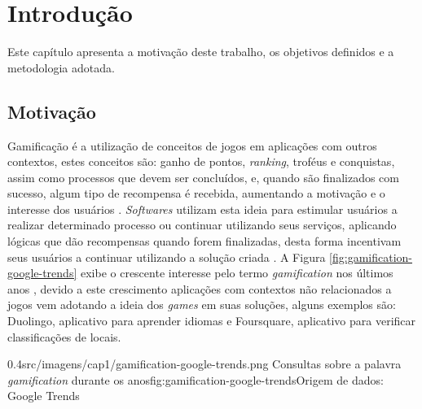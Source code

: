 \chapter[Introdução]{Introdução}
\label{ch:introducao}
\par Este capítulo apresenta a motivação deste trabalho, os objetivos definidos e a metodologia adotada.

\section{Motivação}

\par Gamificação é a utilização de conceitos de jogos em aplicações com outros contextos, estes conceitos são: ganho de pontos, \textit{ranking}, troféus e conquistas, assim como processos que devem ser concluídos, e, quando são finalizados com sucesso, algum tipo de recompensa é recebida, aumentando a motivação e o interesse dos usuários \cite{robson2015all}. \textit{Softwares} utilizam esta ideia para estimular usuários a realizar determinado processo ou continuar utilizando seus serviços, aplicando lógicas que dão recompensas quando forem finalizadas, desta forma incentivam seus usuários a continuar utilizando a solução criada \cite{hamari2014does}. A Figura \ref{fig:gamification-google-trends} exibe o crescente interesse pelo termo \textit{gamification} nos últimos anos \cite{groh2012gamification}, devido a este crescimento aplicações com contextos não relacionados a jogos vem adotando a ideia dos \textit{games} em suas soluções, alguns exemplos são: Duolingo, aplicativo para aprender idiomas e Foursquare, aplicativo para verificar classificações de locais.

\begin{image}
{0.4}{src/imagens/cap1/gamification-google-trends.png}
{Consultas sobre a palavra \textit{gamification} durante os anos}{fig:gamification-google-trends}{Origem de dados: Google Trends }
\end{image}


